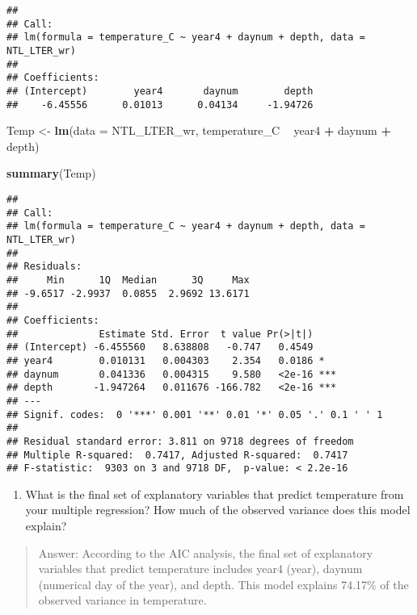 \documentclass[]{article}
\newenvironment{Shaded}{\begin{snugshade}}{\end{snugshade}}
\newcommand{\DataTypeTok}[1]{\textcolor[rgb]{0.13,0.29,0.53}{#1}}
\newcommand{\KeywordTok}[1]{\textcolor[rgb]{0.13,0.29,0.53}{\textbf{#1}}}
\newcommand{\NormalTok}[1]{#1}
\newcommand{\OperatorTok}[1]{\textcolor[rgb]{0.81,0.36,0.00}{\textbf{#1}}}
\newcommand{\StringTok}[1]{\textcolor[rgb]{0.31,0.60,0.02}{#1}}
\providecommand{\tightlist}{%
  \setlength{\itemsep}{0pt}\setlength{\parskip}{0pt}}
\begin{document}
\begin{verbatim}
## 
## Call:
## lm(formula = temperature_C ~ year4 + daynum + depth, data = NTL_LTER_wr)
## 
## Coefficients:
## (Intercept)        year4       daynum        depth  
##    -6.45556      0.01013      0.04134     -1.94726
\end{verbatim}

\begin{Shaded}
\begin{Highlighting}[]
\NormalTok{Temp <-}\StringTok{ }\KeywordTok{lm}\NormalTok{(}\DataTypeTok{data =}\NormalTok{ NTL_LTER_wr, temperature_C }\OperatorTok{~}\StringTok{ }\NormalTok{year4 }\OperatorTok{+}\StringTok{ }\NormalTok{daynum }\OperatorTok{+}\StringTok{ }\NormalTok{depth)}

\KeywordTok{summary}\NormalTok{(Temp)}
\end{Highlighting}
\end{Shaded}

\begin{verbatim}
## 
## Call:
## lm(formula = temperature_C ~ year4 + daynum + depth, data = NTL_LTER_wr)
## 
## Residuals:
##     Min      1Q  Median      3Q     Max 
## -9.6517 -2.9937  0.0855  2.9692 13.6171 
## 
## Coefficients:
##              Estimate Std. Error  t value Pr(>|t|)    
## (Intercept) -6.455560   8.638808   -0.747   0.4549    
## year4        0.010131   0.004303    2.354   0.0186 *  
## daynum       0.041336   0.004315    9.580   <2e-16 ***
## depth       -1.947264   0.011676 -166.782   <2e-16 ***
## ---
## Signif. codes:  0 '***' 0.001 '**' 0.01 '*' 0.05 '.' 0.1 ' ' 1
## 
## Residual standard error: 3.811 on 9718 degrees of freedom
## Multiple R-squared:  0.7417, Adjusted R-squared:  0.7417 
## F-statistic:  9303 on 3 and 9718 DF,  p-value: < 2.2e-16
\end{verbatim}

\begin{enumerate}
\def\labelenumi{\arabic{enumi}.}
\setcounter{enumi}{4}
\tightlist
\item
  What is the final set of explanatory variables that predict
  temperature from your multiple regression? How much of the observed
  variance does this model explain?
\end{enumerate}

\begin{quote}
Answer: According to the AIC analysis, the final set of explanatory
variables that predict temperature includes year4 (year), daynum
(numerical day of the year), and depth. This model explains 74.17\% of
the observed variance in temperature.
\end{quote}
\end{document}
